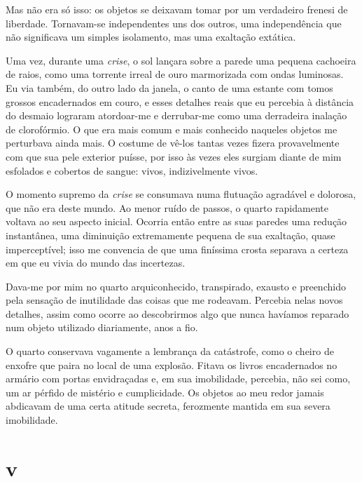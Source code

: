 Mas não era só isso: os objetos se deixavam tomar por um verdadeiro frenesi de
liberdade. Tornavam-se independentes uns dos outros, uma independência que
não significava um simples isolamento, mas uma exaltação extática.


Uma vez, durante uma \textit{crise}, o sol lançara sobre a parede uma pequena
cachoeira de raios, como uma torrente irreal de ouro marmorizada com ondas
luminosas. Eu via também, do outro lado da janela, o canto de uma estante com
tomos grossos encadernados em couro, e esses detalhes reais que eu percebia à
distância do desmaio lograram atordoar-me e derrubar-me como uma derradeira
inalação de clorofórmio. O que era mais comum e mais conhecido naqueles
objetos me perturbava ainda mais. O costume de vê-los tantas vezes fizera
provavelmente com que sua pele exterior puísse, por isso às vezes eles
surgiam diante de mim esfolados e cobertos de sangue: vivos, indizivelmente
vivos.

O momento supremo da \textit{crise} se consumava numa flutuação agradável e
dolorosa, que não era deste mundo. Ao menor ruído de passos, o quarto
rapidamente voltava ao seu aspecto inicial. Ocorria então entre as suas
paredes uma redução instantânea, uma diminuição extremamente pequena de sua
exaltação, quase imperceptível; isso me convencia de que uma finíssima crosta
separava a certeza em que eu vivia do mundo das incertezas.

Dava-me por mim no quarto arquiconhecido, transpirado, exausto e preenchido
pela sensação de inutilidade das coisas que me rodeavam. Percebia nelas novos
detalhes, assim como ocorre ao descobrirmos algo que nunca havíamos reparado
num objeto utilizado diariamente, anos a fio.

O quarto conservava vagamente a lembrança da catástrofe, como o cheiro de
enxofre que paira no local de uma explosão. Fitava os livros encadernados no
armário com portas envidraçadas e, em sua imobilidade, percebia, não sei
como, um ar pérfido de mistério e cumplicidade. Os objetos ao meu redor
jamais abdicavam de uma certa atitude secreta, ferozmente mantida em sua
severa imobilidade.


\section{v} 

